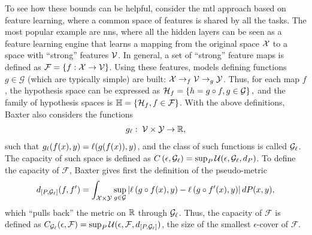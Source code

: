 To see how these bounds can be helpful, consider the \acrshort{mtl} approach based on feature learning, where a common space of features is shared by all the tasks. The most popular example are \acrshort{nns}, where all the hidden layers can be seen as a feature learning engine that learns a mapping from the original space $\mathcal{X}$ to a space with ``strong'' features $\mathcal{V}$.
In general, a set of ``strong'' feature maps is defined as $\mathcal{F} = \left\{f: \mathcal{X} \to \mathcal{V}\right\}$. Using these features, models defining functions $g \in \mathcal{G}$ (which are typically simple) are built:
$\mathcal{X} \to_f \mathcal{V} \to_g \mathcal{Y}$.
Thus, for each map $f$, the hypothesis space can be expressed as 
$\mathcal{H}_f = \left\{h = g \circ f, g \in \mathcal{G}\right\},$ and the family of hypothesis spaces is 
$\mathbb{H} = \left\{\mathcal{H}_f, f \in \mathcal{F}\right\}$.
%
With the above definitions, Baxter also considers the functions
\begin{equation}
    \nonumber
    \begin{aligned}
        g_\ell:\; \mathcal{V} \times \mathcal{Y} \to \mathbb{R}, 
    \end{aligned}
\end{equation}
such that $g_\ell(f(x), y) = \ell(g(f(x)), y)$, and the class of such functions is called $\mathcal{G}_\ell$. The capacity of such space is defined as $C\left(\epsilon, \mathcal{G}_\ell\right) = \sup_P \mathcal{U}(\epsilon, \mathcal{G}_\ell, d_{P})$.
To define the capacity of $\mathcal{F}$, Baxter gives first the definition of the pseudo-metric 
$$ d_{[P, \mathcal{G}_\ell]}(f, f') = \int_{\mathcal{X} \times \mathcal{Y}} \sup_{g \in \mathcal{G}} \left|\ell\left( g \circ f(x), y\right) - \ell\left( g \circ f'(x), y\right)\right| dP(x, y), $$
which ``pulls back'' the metric on $\mathbb{R}$ through $\mathcal{G}_\ell$.
Thus, the capacity of $\mathcal{F}$ is defined as 
$C_{\mathcal{G}_\ell}(\epsilon, \mathcal{F}) = \sup_P \mathcal{U}(\epsilon, \mathcal{F}, d_{[P, \mathcal{G}_\ell]})$, the size of the smallest $\epsilon$-cover of $\mathcal{F}$.

